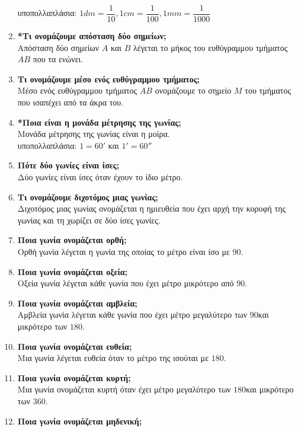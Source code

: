 \documentclass[a4paper,11pt]{report}
\begin{document}
\begin{enumerate}
      υποπολλαπλάσια: $1dm=\dfrac{1}{10},1cm=\dfrac{1}{100},1mm=\dfrac{1}{1000}$
\item \textbf{*Τι ονομάζουμε απόσταση δύο σημείων;}\\
      Απόσταση δύο σημείων $Α$ και $Β$ λέγεται το μήκος του ευθύγραμμου τμήματος $ΑΒ$ που τα ενώνει.
\item \textbf{Τι ονομάζουμε μέσο ενός ευθύγραμμου τμήματος;}\\
      Μέσο ενός ευθύγραμμου τμήματος $ΑΒ$ ονομάζουμε το σημείο $Μ$ του τμήματος που ισαπέχει από τα άκρα του.
\item \textbf{*Ποια είναι η μονάδα μέτρησης της γωνίας;}\\
      Μονάδα μέτρησης της γωνίας είναι η μοίρα.\\
      υποπολλαπλάσια: $1$\textdegree$=60'$ και $1'=60''$
\item \textbf{Πότε δύο γωνίες είναι ίσες;}\\
      Δύο γωνίες είναι ίσες όταν έχουν το ίδιο μέτρο.
\item \textbf{Τι ονομάζουμε διχοτόμος μιας γωνίας;}\\
      Διχοτόμος μιας γωνίας ονομάζεται η ημιευθεία που έχει αρχή την κορυφή της γωνίας και τη χωρίζει σε δύο ίσες γωνίες.
\item \textbf{Ποια γωνία ονομάζεται ορθή;}\\
      Ορθή γωνία λέγεται η γωνία της οποίας το μέτρο είναι ίσο με $90$\textdegree.
\item \textbf{Ποια γωνία ονομάζεται οξεία;}\\
      Οξεία γωνία λέγεται κάθε γωνία που έχει μέτρο μικρότερο από $90$\textdegree.
\item \textbf{Ποια γωνία ονομάζεται αμβλεία;}\\
      Αμβλεία γωνία λέγεται κάθε γωνία που έχει μέτρο μεγαλύτερο των $90$\textdegree και μικρότερο των $180$\textdegree.
\item \textbf{Ποια γωνία ονομάζεται ευθεία;}\\
      Μια γωνία λέγεται ευθεία όταν το μέτρο της ισούται με $180$\textdegree.
\item \textbf{Ποια γωνία ονομάζεται κυρτή;}\\
      Μια γωνία ονομάζεται κυρτή όταν έχει μέτρο μεγαλύτερο των $180$\textdegree και μικρότερο των $360$\textdegree.
\item \textbf{Ποια γωνία ονομάζεται μηδενική;}\\

\end{enumerate}
\end{document}
